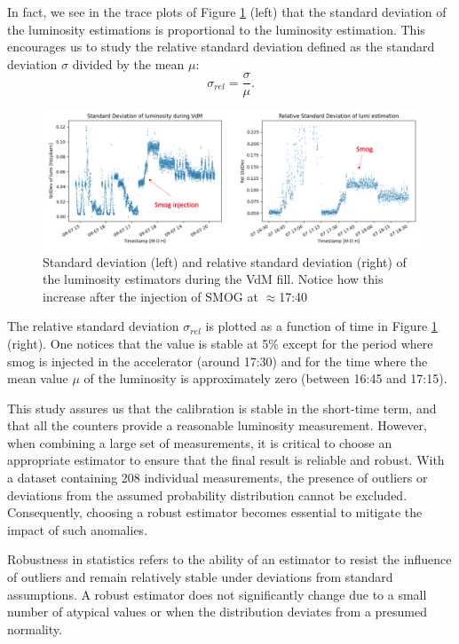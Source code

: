 In fact, we see in the trace plots of Figure \ref{fig:std_dev_rel_std} (left) that the standard deviation of the luminosity estimations is proportional to the luminosity estimation. This encourages us to study the relative standard deviation defined as the standard deviation $\sigma$  divided by the mean $\mu$:
\begin{equation}
    \sigma_{rel} = \frac{\sigma}{\mu} \label{rel_std}.
\end{equation}


\begin{figure}
    \centering
    \includegraphics[width=\textwidth]{figures/std_dev_and_rel_std.png}
    \caption{Standard deviation (left) and relative standard deviation (right) of the luminosity estimators during the VdM fill. Notice how this increase after the injection of SMOG at $\approx$17:40}
    \label{fig:std_dev_rel_std}
\end{figure}


The relative standard deviation $\sigma_{rel}$ is plotted as a function of time in Figure \ref{fig:std_dev_rel_std} (right). One notices that the value is stable at 5\% except for the period where smog is injected in the accelerator (around 17:30) and for the time where the mean value $\mu$ of the luminosity is approximately zero (between 16:45 and 17:15).  

This study assures us that the calibration is stable in the short-time term, and that all the counters provide a reasonable luminosity measurement. However, when combining a large set of measurements, it is critical to choose an appropriate estimator to ensure that the final result is reliable and robust. With a dataset containing 208 individual measurements, the presence of outliers or deviations from the assumed probability distribution cannot be excluded. Consequently, choosing a robust estimator becomes essential to mitigate the impact of such anomalies.

Robustness in statistics refers to the ability of an estimator to resist the influence of outliers and remain relatively stable under deviations from standard assumptions. A robust estimator does not significantly change due to a small number of atypical values or when the distribution deviates from a presumed normality.

